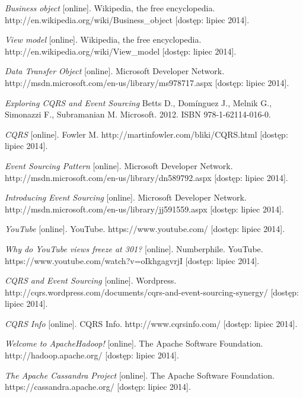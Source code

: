 \begin{thebibliography}{}
  \emph{Business object} [online].
  Wikipedia, the free encyclopedia.
  http://en.wikipedia.org/wiki/Business\_object [dostęp: lipiec 2014].
  
  \emph{View model} [online].
  Wikipedia, the free encyclopedia.
  http://en.wikipedia.org/wiki/View\_model [dostęp: lipiec 2014].
 
  \emph{Data Transfer Object} [online].
  Microsoft Developer Network.
  http://msdn.microsoft.com/en-us/library/ms978717.aspx [dostęp: lipiec 2014].
 
  \emph{Exploring CQRS and Event Sourcing}
  Betts D., Domínguez J., Melnik G., Simonazzi F., Subramanian M.
  Microsoft.
  2012.
  ISBN 978-1-62114-016-0.
 
  \emph{CQRS} [online].
  Fowler M.
  http://martinfowler.com/bliki/CQRS.html [dostęp: lipiec 2014].
 
  \emph{Event Sourcing Pattern} [online].
  Microsoft Developer Network.
  http://msdn.microsoft.com/en-us/library/dn589792.aspx [dostęp: lipiec 2014].
 
  \emph{Introducing Event Sourcing} [online].
  Microsoft Developer Network.
  http://msdn.microsoft.com/en-us/library/jj591559.aspx [dostęp: lipiec 2014].
 
  \emph{YouTube} [online].
  YouTube.
  https://www.youtube.com/ [dostęp: lipiec 2014].
 
  \emph{Why do YouTube views freeze at 301?} [online].
  Numberphile.
  YouTube.
  https://www.youtube.com/watch?v=oIkhgagvrjI [dostęp: lipiec 2014].
 
  \emph{CQRS and Event Sourcing} [online].
  Wordpress.
  http://cqrs.wordpress.com/documents/cqrs-and-event-sourcing-synergy/ [dostęp: lipiec 2014].
  
  \emph{CQRS Info} [online].
  CQRS Info.
  http://www.cqrsinfo.com/ [dostęp: lipiec 2014].

  \emph{Welcome to Apache\texttrademark Hadoop\textregistered!} [online].
  The Apache Software Foundation.
  http://hadoop.apache.org/ [dostęp: lipiec 2014].
 
  \emph{The Apache Cassandra Project} [online].
  The Apache Software Foundation.
  https://cassandra.apache.org/ [dostęp: lipiec 2014].
 

\end{thebibliography}
